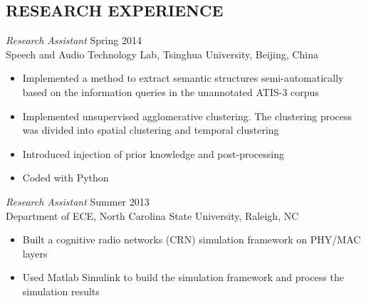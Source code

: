 \documentclass[margin, 10pt]{res} %
\begin{document}
\begin{resume}

\section{RESEARCH EXPERIENCE}



{\sl Research Assistant} \hfill Spring 2014 \\
Speech and Audio Technology Lab, Tsinghua University, Beijing, China
\begin{itemize} \itemsep -2pt
\item Implemented a method to extract semantic structures semi-automatically based on the information queries in the unannotated ATIS-3 corpus
\item Implemented unsupervised agglomerative clustering. The clustering process was divided into spatial clustering and temporal clustering
\item Introduced injection of prior knowledge and post-processing
\item Coded with Python
\end{itemize}

{\sl Research Assistant} \hfill Summer 2013 \\
Department of ECE, North Carolina State University, Raleigh, NC
\begin{itemize} \itemsep -2pt
\item Built a cognitive radio networks (CRN) simulation framework
on PHY/MAC layers
\item Used Matlab Simulink to build the simulation framework and process the simulation results
\end{itemize}


\end{resume}
\end{document}
